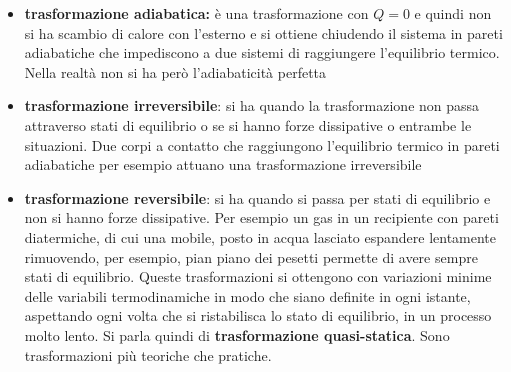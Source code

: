 \documentclass[a4paper,12pt, oneside]{book}
\begin{document}
\begin{itemize}
	\item \textbf{trasformazione adiabatica:} è una trasformazione con $Q=0$ e quindi non si ha scambio di calore con l'esterno e si ottiene chiudendo il sistema in pareti adiabatiche che impediscono a  due sistemi di raggiungere l'equilibrio termico. Nella realtà non si ha però l'adiabaticità perfetta
	\item \textbf{trasformazione irreversibile}: si ha quando la trasformazione non passa attraverso stati di equilibrio o se si hanno forze dissipative o entrambe le situazioni. Due corpi a contatto che raggiungono l'equilibrio termico in pareti adiabatiche per esempio attuano una trasformazione irreversibile
	\item \textbf{trasformazione reversibile}: si ha quando si passa per stati di equilibrio e non si hanno forze dissipative. Per esempio un gas in un recipiente con pareti diatermiche, di cui una mobile, posto in acqua lasciato espandere lentamente rimuovendo, per esempio, pian piano dei pesetti permette di avere sempre stati di equilibrio. Queste trasformazioni si ottengono con variazioni minime delle variabili termodinamiche in modo che siano definite in ogni istante, aspettando ogni volta che si ristabilisca lo stato di equilibrio, in un processo molto lento. Si parla quindi di \textbf{trasformazione quasi-statica}. Sono trasformazioni più teoriche che pratiche.
\end{itemize}
\end{document}
